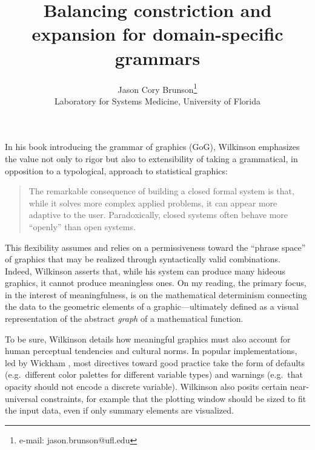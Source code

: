 \documentclass{vgtc}                          %
\title{Balancing constriction and expansion for domain-specific grammars}
\author{Jason Cory Brunson\thanks{e-mail: jason.brunson@ufl.edu}\\ %
        \scriptsize Laboratory for Systems Medicine, University of Florida}%
\begin{document}


\maketitle

In his book introducing the grammar of graphics (GoG), Wilkinson \cite{Wilkinson2005} emphasizes the value not only to rigor but also to extensibility of taking a grammatical, in opposition to a typological, approach to statistical graphics:

\begin{quote}
The remarkable consequence of building a closed formal system is that, while it solves more complex applied problems, it can appear more adaptive to the user. Paradoxically, closed systems often behave more ``openly'' than open systems.
\end{quote}

This flexibility assumes and relies on a permissiveness toward the ``phrase space'' of graphics that may be realized through syntactically valid combinations.
Indeed, Wilkinson asserts that, while his system can produce many hideous graphics, it cannot produce meaningless ones.
On my reading, the primary focus, in the interest of meaningfulness, is on the mathematical determinism connecting the data to the geometric elements of a graphic---ultimately defined as a visual representation of the abstract \emph{graph} of a mathematical function.

To be sure, Wilkinson details how meaningful graphics must also account for human perceptual tendencies and cultural norms.
In popular implementations, led by Wickham \cite{Wickham2009}, most directives toward good practice take the form of defaults (e.g.~different color palettes for different variable types) and warnings (e.g.~that opacity should not encode a discrete variable).
Wilkinson also posits certain near-universal constraints, for example that the plotting window should be sized to fit the input data, even if only summary elements are visualized.
\end{document}
